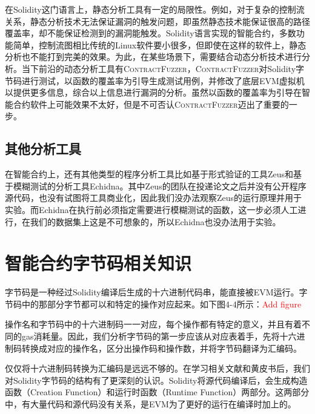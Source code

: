 在Solidity这门语言上，静态分析工具有一定的局限性。例如，对于复杂的控制流关系，静态分析技术无法保证漏洞的触发问题，即虽然静态技术能保证很高的路径覆盖率，却不能保证检测到的漏洞能触发。Solidity语言实现的智能合约，多数功能简单，控制流图相比传统的Linux软件要小很多，但即使在这样的软件上，静态分析也不能打到完美的效果。为此，在某些场景下，需要结合动态分析技术进行分析。当下前沿的动态分析工具有\textsc{ContractFuzzer}\cite{contractfuzzer}，\textsc{ContractFuzzer}对Solidity字节码进行测试，以函数的覆盖率为引导生成测试用例，并修改了底层EVM虚拟机以提供更多信息，综合以上信息进行漏洞的分析。虽然以函数的覆盖率为引导在智能合约软件上可能效果不太好，但是不可否认\textsc{ContractFuzzer}迈出了重要的一步。

\subsection{其他分析工具}

在智能合约上，还有其他类型的程序分析工具比如基于形式验证的工具Zeus和基于模糊测试的分析工具Echidna。其中Zeus的团队在投递论文之后并没有公开程序源代码，也没有试图将工具商业化，因此我们没办法观察Zeus的运行原理并用于实验。而Echidna在执行前必须指定需要进行模糊测试的函数，这一步必须人工进行，在我们的数据集上这是不可想象的，所以Echidna也没办法用于实验。

\section{智能合约字节码相关知识}

字节码是一种经过Solidity编译后生成的十六进制代码串，能直接被EVM运行。字节码中的那部分字节都可以和特定的操作对应起来。如下图4-4所示：\textcolor{red}{Add figure}

操作名和字节码中的十六进制码一一对应，每个操作都有特定的意义，并且有着不同的gas消耗量。因此，我们分析字节码的第一步应该从对应表着手，先将十六进制码转换成对应的操作名，区分出操作码和操作数，并将字节码翻译为汇编码。

仅仅将十六进制码转换为汇编码是远远不够的。在学习相关文献和黄皮书后，我们对Solidity字节码的结构有了更深刻的认识。Solidity将源代码编译后，会生成构造函数（Creation Function）和运行时函数（Runtime Function）两部分。这两部分中，有大量代码和源代码没有关系，是EVM为了更好的运行在编译时加上的。

